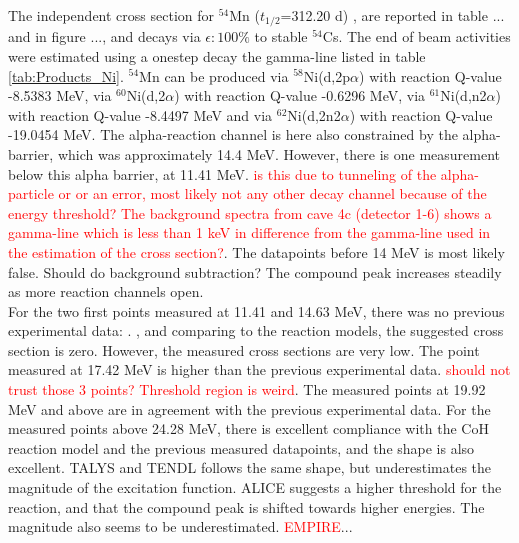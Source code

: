 \documentclass[a4paper,11pt,twoside]{book}
\begin{document}
\subsubsection{}
The independent cross section for $^{54}$Mn ($t_{1/2}$=312.20 d) \cite{Dong2014}, are reported in table ... and in figure ..., and decays via $\epsilon:100\%$ to stable $^{54}$Cs. The end of beam activities were estimated using a onestep decay the gamma-line listed in table \ref{tab:Products_Ni}. $^{54}$Mn can be produced via $^{58}$Ni(d,2p$\alpha$) with reaction Q-value -8.5383 MeV, via $^{60}$Ni(d,2$\alpha$) with reaction Q-value -0.6296 MeV, via $^{61}$Ni(d,n2$\alpha$) with reaction Q-value -8.4497 MeV and via $^{62}$Ni(d,2n2$\alpha$) with reaction Q-value -19.0454 MeV. The alpha-reaction channel is here also constrained by the alpha-barrier, which was approximately 14.4 MeV. However, there is one measurement below this alpha barrier, at 11.41 MeV. \textcolor{red}{is this due to tunneling of the alpha-particle or or an error, most likely not any other decay channel because of the energy threshold? The background spectra from cave 4c (detector 1-6) shows a gamma-line which is less than 1 keV in difference from the gamma-line used in the estimation of the cross section?}. The datapoints before 14 MeV is most likely false. Should do background subtraction? The compound peak increases steadily as more reaction channels open. \\ 
\noindent 
For the two first points measured at 11.41 and 14.63 MeV, there was no previous experimental data: \cite{Hermanne2013, Takacs2007, Usman2016,  Amjed2013}. , and comparing to the reaction models, the suggested cross section is zero. However, the measured cross sections are very low. The point measured at 17.42 MeV is higher than the previous experimental data. \textcolor{red}{should not trust those 3 points? Threshold region is weird}. The measured points at 19.92 MeV and above are in agreement with the previous experimental data. For the measured points above 24.28 MeV, there is excellent compliance with the CoH reaction model and the previous measured datapoints, and the shape is also excellent. TALYS and TENDL follows the same shape, but underestimates the magnitude of the excitation function. ALICE suggests a higher threshold for the reaction, and that the compound peak is shifted towards higher energies. The magnitude also seems to be underestimated. \textcolor{red}{EMPIRE}...
\end{document}
